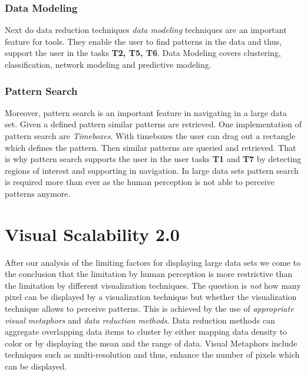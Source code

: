 \subsubsection{Data Modeling}
Next do data reduction techniques \textit{data modeling} techniques are an important feature for tools. They enable the user to find patterns in the data and thus, support the user in the tasks \textbf{T2, T5, T6}. Data Modeling covers clustering, classification, network modeling and predictive modeling\cite{Zhanga}. 

\subsubsection{Pattern Search}\label{patternsearch}
Moreover, pattern search is an important feature in navigating in a large data set. Given a defined pattern similar patterns are retrieved. One implementation of pattern search are \textit{Timeboxes}\cite{Buono}. With timeboxes the user can drag out a rectangle which defines the pattern. Then similar patterns are queried and retrieved. That is why pattern search supports the user in the user tasks \textbf{T1} and \textbf{T7} by detecting regions of interest and supporting in navigation. In large data sets pattern search is required more than ever as the human perception is not able to perceive patterns anymore.






\section{Visual Scalability 2.0}
After our analysis of the limiting factors for displaying large data sets we come to the conclusion that the limitation by human perception is more restrictive than the limitation by different visualization techniques. The question is \textit{not} how many pixel can be displayed by a visualization technique but whether the visualization technique allows to perceive patterns. This is achieved by the use of \textit{appropriate visual metaphors} and \textit{data reduction methods}. Data reduction methods can aggregate overlapping data items to cluster by either mapping data density to color or by displaying the mean and the range of data. Visual Metaphors include techniques such as multi-resolution and thus, enhance the number of pixels which can be displayed. 

